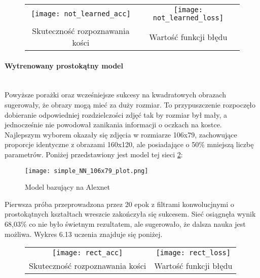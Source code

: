 \begin{figure}[h!]
\begin{center}
\begin{tabular}{cc}
\texttt{[image: not\_learned\_acc]} &
\texttt{[image: not\_learned\_loss]} \\
 Skuteczność rozpoznawania kości & Wartość funkcji błędu\\
\end{tabular}
\label{fig:not_learned}
\end{center}
\end{figure}

\paragraph{Wytrenowany prostokątny model} \mbox{}\\
Powyższe porażki oraz wcześniejsze sukcesy na kwadratowych obrazach sugerowały, że
obrazy mogą mieć za duży rozmiar. To przypuszczenie rozpoczęło dobieranie
odpowiedniej rozdzielczości zdjęć tak by rozmiar był mały, a jednocześnie nie powodował
zanikania informacji o oczkach na kostce. Najlepszym wyborem okazały się zdjęcia w rozmiarze 106x79,
zachowujące proporcje identyczne z obrazami 160x120, ale posiadające o 50\% mniejszą liczbę parametrów.
Poniżej przedstawiony jest model tej sieci \ref{fig:simple_106x79}:
\newpage
\begin{figure}[h!]
\centering
\texttt{[image: simple\_NN\_106x79\_plot.png]}
\caption{Model bazujący na Alexnet}
\label{fig:simple_106x79}
\end{figure}
Pierwsza próba przeprowadzona przez 20 epok z filtrami konwolucjnymi o prostokątnych
kształtach wreszcie zakończyła się sukcesem. Sieć osiągnęła wynik 68,03\% co nie
było świetnym rezultatem, ale sugerowało, że dalsza nauka jest możliwa. Wykres 6.13 uczenia znajduje się poniżej.\\

\begin{figure}[h!]
\begin{center}
\begin{tabular}{cc}
\texttt{[image: rect\_acc]} &
\texttt{[image: rect\_loss]} \\
 Skuteczność rozpoznawania kości & Wartość funkcji błędu\\
\end{tabular}
\label{fig:rect_learned}
\end{center}
\end{figure}

